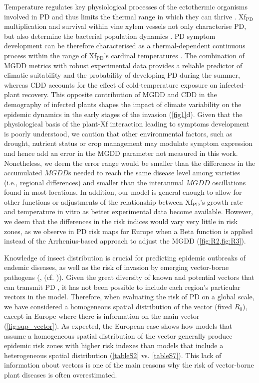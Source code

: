     Temperature regulates key physiological processes of the ectothermic
    organisms involved in PD and thus limits the thermal range in which they
    can thrive \cite{Coakley1999}. Xf$_{\textrm{PD}}$ multiplication and
    survival within vine xylem vessels not only characterise PD, but also
    determine the bacterial population dynamics
    \cite{fry1990multiplication,Feil2001}. PD symptom development can be
    therefore characterised as a thermal-dependent continuous process within
    the range of  Xf$_{\textrm{PD}}$'s cardinal temperatures \cite{Scherm1994}.
    The combination of MGDD metrics with robust experimental data provides a
    reliable predictor of climatic suitability and the probability of
    developing PD during the summer, whereas CDD accounts for the effect of
    cold-temperature exposure on infected-plant recovery. This opposite
    contribution of MGDD and CDD in the demography of infected plants shapes
    the impact of climate variability on the epidemic dynamics in the early
    stages of the invasion (\cref{fig1}d). Given that the physiological basis
    of the plant-Xf interaction leading to symptoms development is poorly
    understood, we caution that other environmental factors, such as drought,
    nutrient status or crop management may modulate symptom expression and
    hence add an error in the MGDD parameter not measured in this work.
    Nonetheless, we deem the error range would be smaller than the differences
    in the accumulated $MGDD$s needed to reach the same disease level among
    varieties (i.e., regional differences) and smaller than the interannual
$MGDD$ oscillations found in most locations. In addition, our model is general
    enough to allow for other functions or adjustments of the relationship
    between Xf$_{\textrm{PD}}$'s growth rate and temperature in vitro
    as better experimental data become available. However, we deem that the
    differences in the risk indices would vary very little in risk zones, as we
    observe in PD risk maps for Europe when a Beta function is applied instead
    of the Arrhenius-based approach to adjust the MGDD (\cref{fig:R2,fig:R3}).

    Knowledge of insect distribution is crucial for predicting epidemic
    outbreaks of endemic diseases, as well as the risk of invasion by emerging
    vector-borne pathogens (\cite {Caminade2017,Jeger2019}, (cf.
    \cite{Schneider2020})). Given the great diversity of known and potential
    vectors that can transmit PD \cite{Redak2004}, it has not been possible to
    include each region's particular vectors in the model. Therefore, when
    evaluating the risk of PD on a global scale, we have considered a
    homogeneous spatial distribution of the vector (fixed $ R_0 $), except in
    Europe where there is information on the main vector
    (\cref{fig:sup_vector}). As expected, the European case shows how models
    that assume a homogeneous spatial distribution of the vector generally
    produce epidemic risk zones with higher risk indexes than models that
    include a heterogeneous spatial distribution (\cref{tableS2} vs.
    \cref{tableS7}). This lack of information about vectors is one of the main
    reasons why the risk of vector-borne plant diseases is often overestimated.

